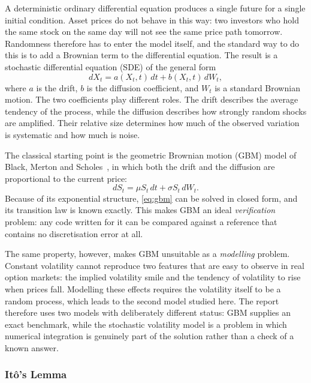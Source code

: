 \documentclass[11pt,a4paper]{article}
\theoremstyle{definition}
\theoremstyle{remark}
\begin{document}
A deterministic ordinary differential equation produces a single future for a
single initial condition. Asset prices do not behave in this way: two investors
who hold the same stock on the same day will not see the same price path
tomorrow. Randomness therefore has to enter the model itself, and the standard
way to do this is to add a Brownian term to the differential equation. The
result is a stochastic differential equation (SDE) of the general form
\begin{equation}
    dX_t = a(X_t, t)\,dt + b(X_t, t)\,dW_t,
    \label{eq:general-sde}
\end{equation}
where $a$ is the drift, $b$ is the diffusion coefficient, and $W_t$ is a
standard Brownian motion. The two coefficients play different roles. The drift
describes the average tendency of the process, while the diffusion describes
how strongly random shocks are amplified. Their relative size determines how
much of the observed variation is systematic and how much is noise.

The classical starting point is the geometric Brownian motion (GBM) model of
Black, Merton and Scholes~\cite{blackscholes}, in which both the drift and the
diffusion are proportional to the current price:
\begin{equation}
    dS_t = \mu S_t\,dt + \sigma S_t\,dW_t .
    \label{eq:gbm}
\end{equation}
Because of its exponential structure, \eqref{eq:gbm} can be solved in closed
form, and its transition law is known exactly. This makes GBM an ideal
\emph{verification} problem: any code written for it can be compared against a
reference that contains no discretisation error at all.

The same property, however, makes GBM unsuitable as a \emph{modelling} problem.
Constant volatility cannot reproduce two features that are easy to observe in
real option markets: the implied volatility smile and the tendency of
volatility to rise when prices fall. Modelling these effects requires the
volatility itself to be a random process, which leads to the second model
studied here. The report therefore uses two models with deliberately different
status: GBM supplies an exact benchmark, while the stochastic volatility model
is a problem in which numerical integration is genuinely part of the solution
rather than a check of a known answer.

\subsubsection{It\^o's Lemma}
\label{sec:ito}
\end{document}
